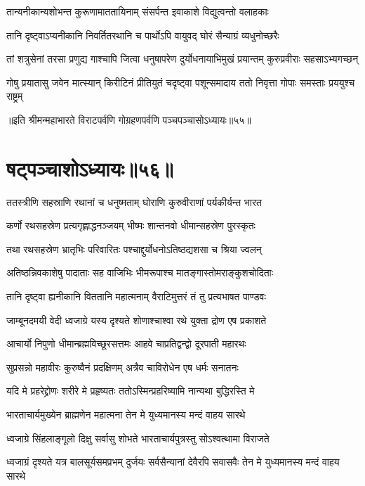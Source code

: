 \twolineshloka
{तान्यनीकान्यशोभन्त कुरूणामाततायिनाम्}
{संसर्पन्त इवाकाशे विद्युत्वन्तो वलाहकाः}

\twolineshloka
{तानि दृष्ट्वाऽप्यनीकानि निवर्तितरथानि च}
{पार्थोऽपि वायुवद् घोरं सैन्याग्रं व्यधुनोच्छरैः}

\fourlineindentedshloka
{तां शत्रुसेनां तरसा प्रणुद्य}
{गाश्चापि जित्वा धनुषापरेण}
{दुर्योधनायाभिमुखं प्रयान्तम्}
{कुरुप्रवीराः सहसाऽभ्यगच्छन्}


\fourlineindentedshloka
{गोषु प्रयातासु जवेन मात्स्यान्}
{किरीटिनं प्रीतियुतं चदृष्ट्वा}
{पशून्समादाय ततो निवृत्ता}
{गोपाः समस्ताः प्रययुश्च राष्ट्रम्}

॥इति श्रीमन्महाभारते विराटपर्वणि गोग्रहणपर्वणि पञ्चपञ्चासोऽध्यायः॥५५॥

\chapter{षट्पञ्चाशोऽध्यायः॥५६॥}

\twolineshloka
{ततस्त्रीणि सहस्राणि रथानां च धनुष्मताम्}
{घोराणि कुरुवीराणां पर्यकीर्यन्त भारत}


\twolineshloka
{कर्णो रथसहस्रेण प्रत्यगृह्णाद्धनञ्जयम्}
{भीष्मः शान्तनवो धीमान्सहस्रेण पुरस्कृतः}


\twolineshloka
{तथा रथसहस्रेण भ्रातृभिः परिवारितः}
{पश्चाद्दुर्योधनोऽतिष्ठद्यशसा च श्रिया ज्वलन्}


\twolineshloka
{अतिष्ठन्निवकाशेषु पादाताः सह वाजिभिः}
{भीमरूपाश्च मातङ्गास्तोमराङ्कुशचोदिताः}


\twolineshloka
{तानि दृष्ट्वा ह्यनीकानि विततानि महात्मनाम्}
{वैराटिमुत्तरं तं तु प्रत्यभाषत पाण्डवः}


\twolineshloka
{जाम्बूनदमयी वेदी ध्वजाग्रे यस्य दृश्यते}
{शोणाश्चाश्वा रथे युक्ता द्रोण एष प्रकाशते}


\twolineshloka
{आचार्यो निपुणो धीमान्ब्रह्मविच्छूरसत्तमः}
{आहवे चाप्रतिद्वन्द्वो दूरपाती महारथः}


\twolineshloka
{सुप्रसन्नो महावीरः कुरुष्वैनं प्रदक्षिणम्}
{अत्रैव चाविरोधेन एष धर्मः सनातनः}


\twolineshloka
{यदि मे प्रहरेद्द्रोणः शरीरे मे प्रहृष्यतः}
{ततोऽस्मिन्प्रहरिष्यामि नान्यथा बुद्धिरस्ति मे}


\twolineshloka
{भारताचार्यमुख्येन ब्राह्मणेन महात्मना}
{तेन मे युध्यमानस्य मन्दं वाहय सारथे}


\twolineshloka
{ध्वजाग्रे सिंहलाङ्गूलो दिक्षु सर्वासु शोभते}
{भारताचार्यपुत्रस्तु सोऽश्वत्थामा विराजते}


\threelineshloka
{ध्वजाग्रं दृश्यते यत्र बालसूर्यसमप्रभम्}
{दुर्जयः सर्वसैन्यानां देवैरपि सवासवैः}
{तेन मे युध्यमानस्य मन्दं वाहय सारथे}



